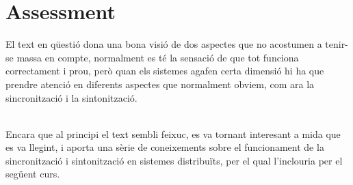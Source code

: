\documentclass[a4paper, 10pt]{article}
\begin{document}
\section{Assessment}

El text en qüestió dona una bona visió de dos aspectes que no acostumen a tenir-se massa en compte, normalment es té la sensació de que tot funciona correctament i prou, però quan els sistemes agafen certa dimensió hi ha que prendre atenció en diferents aspectes que normalment obviem, com ara la sincronització i la sintonització.


\hspace{-0,55cm}\\Encara que al principi el text sembli feixuc, es va tornant interesant a mida que es va llegint, i aporta una sèrie de coneixements sobre el funcionament de la sincronització i sintonització en sistemes distribuïts, per el qual l'inclouria per el següent curs.
\end{document}
